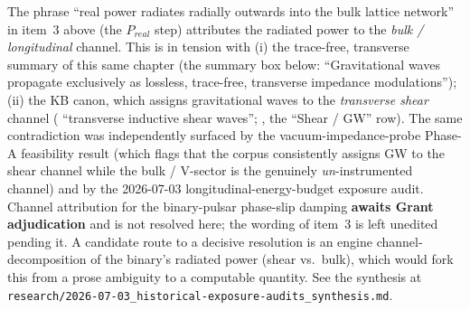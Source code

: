 \begin{warningbox}
\medskip
\noindent
The phrase ``real power radiates radially outwards into the bulk lattice
network'' in item~3 above (the $P_{real}$ step) attributes the radiated
power to the \emph{bulk / longitudinal} channel. This is in tension with (i)
the trace-free, transverse summary of this same chapter (the summary box
below: ``Gravitational waves propagate exclusively as lossless, trace-free,
transverse impedance modulations''); (ii) the KB canon, which assigns
gravitational waves to the \emph{transverse shear} channel
(
``transverse inductive shear waves'';
,
the ``Shear / GW'' row). The same contradiction was independently surfaced by
the vacuum-impedance-probe Phase-A feasibility result (which flags that the
corpus consistently assigns GW to the shear channel while the bulk /
V-sector is the genuinely \emph{un}-instrumented channel) and by the
2026-07-03 longitudinal-energy-budget exposure audit. Channel attribution
for the binary-pulsar phase-slip damping \textbf{awaits Grant adjudication}
and is not resolved here; the wording of item~3 is left unedited pending it.
A candidate route to a decisive resolution is an engine channel-decomposition
of the binary's radiated power (shear vs.\ bulk), which would fork this from
a prose ambiguity to a computable quantity. See the synthesis at
\texttt{research/2026-07-03\_historical-exposure-audits\_synthesis.md}.
\end{warningbox}

